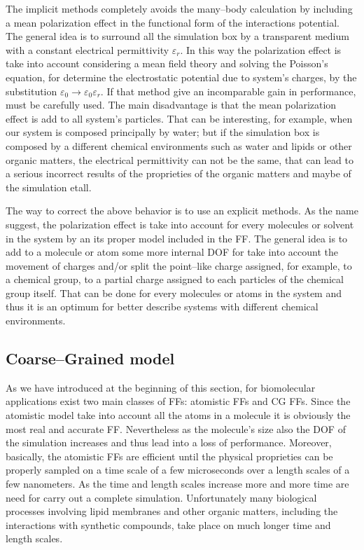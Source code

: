 The implicit methods completely avoids the many--body calculation by including a mean polarization effect in the functional form of the interactions potential. The general idea is to surround all the simulation box by a transparent medium with a constant electrical permittivity $\varepsilon_r$. In this way the polarization effect is take into account considering a mean field theory and solving the Poisson's equation, for determine the electrostatic potential due to system's charges, by the substitution $\varepsilon_0\rightarrow\varepsilon_0\varepsilon_r$. If that method give an incomparable gain in performance, must be carefully used. The main disadvantage is that the mean polarization effect is add to all system's particles. That can be interesting, for example, when our system is composed principally by water; but if the simulation box is composed by a different chemical environments such as water and lipids or other organic matters, the electrical permittivity can not be the same, that can lead to a serious incorrect results of the proprieties of the organic matters and maybe of the simulation etall.

The way to correct the above behavior is to use an explicit methods. As the name suggest, the polarization effect is take into account for every molecules or solvent in the system by an its proper model included in the \ac{FF}. The general idea is to add to a molecule or atom some more internal \ac{DOF} for take into account the movement of charges and/or split the point--like charge assigned, for example, to a chemical group, to a partial charge assigned to each particles of the chemical group itself. That can be done for every molecules or atoms in the system and thus it is an optimum for better describe systems with different chemical environments.

\subsection{Coarse--Grained model}
As we have introduced at the beginning of this section, for biomolecular applications exist two main classes of \acp{FF}: atomistic \acp{FF} and \ac{CG} \acp{FF}. Since the atomistic model take into account all the atoms in a molecule it is obviously the most real and accurate \ac{FF}. Nevertheless as the molecule's size also the \ac{DOF} of the simulation increases and thus lead into a loss of performance. Moreover, basically, the atomistic \acp{FF} are efficient until the physical proprieties can be properly sampled on a time scale of a few microseconds over a length scales of a few nanometers. As the time and length scales increase more and more time are need for carry out a complete simulation. Unfortunately many biological processes involving lipid membranes and other organic matters, including the interactions with synthetic compounds, take place on much longer time and length scales.

